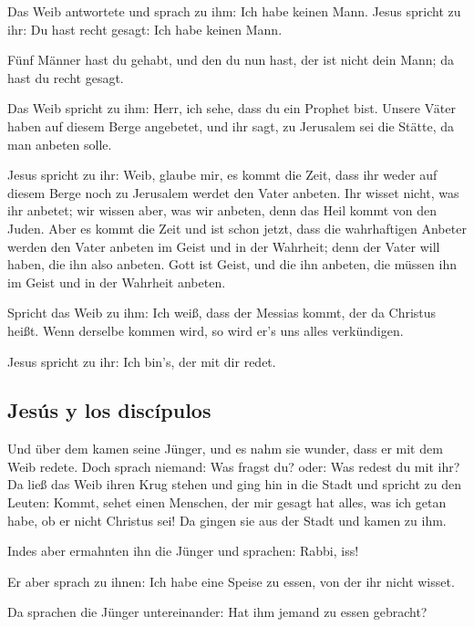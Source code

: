  Das Weib antwortete und sprach zu ihm: Ich habe keinen
Mann. Jesus spricht zu ihr: Du hast recht gesagt: Ich habe keinen Mann.

 Fünf Männer hast du gehabt, und den du nun hast, der ist
nicht dein Mann; da hast du recht gesagt.

 Das Weib spricht zu ihm: Herr, ich sehe, dass du ein
Prophet bist.  Unsere Väter haben auf diesem Berge
angebetet, und ihr sagt, zu Jerusalem sei die Stätte, da man anbeten
solle.

 Jesus spricht zu ihr: Weib, glaube mir, es kommt die
Zeit, dass ihr weder auf diesem Berge noch zu Jerusalem werdet den Vater
anbeten.  Ihr wisset nicht, was ihr anbetet; wir wissen
aber, was wir anbeten, denn das Heil kommt von den Juden.
 Aber es kommt die Zeit und ist schon jetzt, dass die
wahrhaftigen Anbeter werden den Vater anbeten im Geist und in der
Wahrheit; denn der Vater will haben, die ihn also anbeten.
 Gott ist Geist, und die ihn anbeten, die müssen ihn im
Geist und in der Wahrheit anbeten.

 Spricht das Weib zu ihm: Ich weiß, dass der Messias
kommt, der da Christus heißt. Wenn derselbe kommen wird, so wird er's
uns alles verkündigen.

 Jesus spricht zu ihr: Ich bin's, der mit dir redet.

\hypertarget{jesuxfas-y-los-discuxedpulos}{%
\subsection{Jesús y los discípulos}\label{jesuxfas-y-los-discuxedpulos}}

 Und über dem kamen seine Jünger, und es nahm sie wunder,
dass er mit dem Weib redete. Doch sprach niemand: Was fragst du? oder:
Was redest du mit ihr?  Da ließ das Weib ihren Krug
stehen und ging hin in die Stadt und spricht zu den Leuten:
 Kommt, sehet einen Menschen, der mir gesagt hat alles,
was ich getan habe, ob er nicht Christus sei!  Da gingen
sie aus der Stadt und kamen zu ihm.

 Indes aber ermahnten ihn die Jünger und sprachen: Rabbi,
iss!

 Er aber sprach zu ihnen: Ich habe eine Speise zu essen,
von der ihr nicht wisset.

 Da sprachen die Jünger untereinander: Hat ihm jemand zu
essen gebracht?

